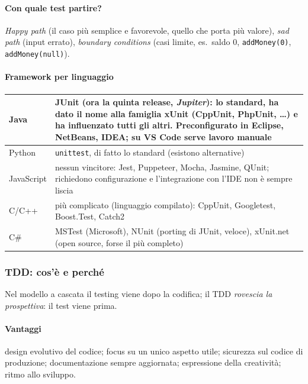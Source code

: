 \documentclass[a4paper,12pt]{article}
\begin{document}
\paragraph{Con quale test partire?} \emph{Happy path} (il caso più semplice e favorevole,
quello che porta più valore), \emph{sad path} (input errato), \emph{boundary conditions}
(casi limite, es.\ saldo 0, \texttt{addMoney(0)}, \texttt{addMoney(null)}).

\paragraph{Framework per linguaggio}
\begin{center}
\begin{tabular}{|l|p{11.5cm}|}
\hline
Java & \textbf{JUnit} (ora la quinta release, \emph{Jupiter}): lo standard, ha dato il nome
alla famiglia \textbf{xUnit} (CppUnit, PhpUnit, \dots) e ha influenzato tutti gli altri.
Preconfigurato in Eclipse, NetBeans, IDEA; su VS Code serve lavoro manuale\\
\hline
Python & \texttt{unittest}, di fatto lo standard (esistono alternative)\\
\hline
JavaScript & nessun vincitore: Jest, Puppeteer, Mocha, Jasmine, QUnit; richiedono
configurazione e l'integrazione con l'IDE non è sempre liscia\\
\hline
C/C++ & più complicato (linguaggio compilato): CppUnit, Googletest, Boost.Test,
Catch2\\
\hline
C\# & MSTest (Microsoft), NUnit (porting di JUnit, veloce), xUnit.net (open source, forse
il più completo)\\
\hline
\end{tabular}
\end{center}

\subsubsection{TDD: cos'è e perché}
Nel modello a cascata il testing viene dopo la codifica; il TDD \emph{rovescia la
prospettiva}: il test viene prima. 

\paragraph{Vantaggi} design evolutivo del codice; focus su un unico aspetto utile;
sicurezza sul codice di produzione; documentazione sempre aggiornata; espressione della
creatività; ritmo allo sviluppo.
\end{document}
